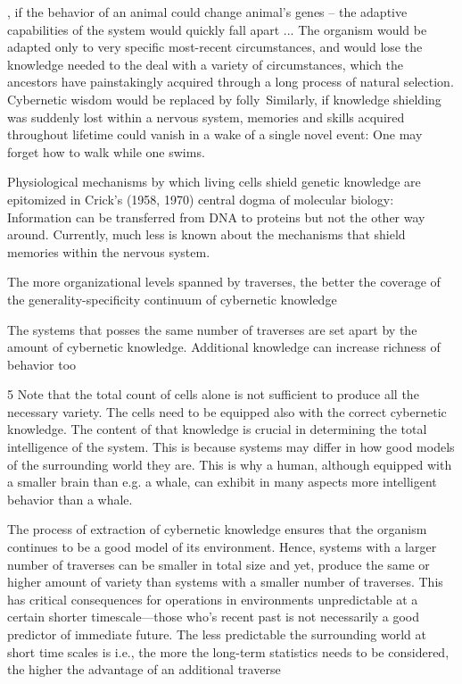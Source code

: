 \documentclass[10pt,a4paper]{article}
\begin{document}
, if the behavior of an
animal could change animal’s genes – the adaptive capabilities of the
system would quickly fall apart ... The organism would be adapted only to very specific
most-recent circumstances, and would lose the knowledge needed to
the deal with a variety of circumstances, which the ancestors have
painstakingly acquired through a long process of natural selection.
Cybernetic wisdom would be replaced by folly\
Similarly, if knowledge shielding was suddenly lost within a
nervous system, memories and skills acquired throughout lifetime
could vanish in a wake of a single novel event: One may forget
how to walk while one swims.

Physiological mechanisms by which living cells shield genetic
knowledge are epitomized in Crick’s (1958, 1970) central dogma of
molecular biology: Information can be transferred from DNA to proteins
but not the other way around. Currently, much less is known about the
mechanisms that shield memories within the nervous system.

The more organizational levels spanned by
traverses, the better the coverage of the generality-specificity continuum
of cybernetic knowledge

The systems that posses the
same number of traverses are set apart by the amount of
cybernetic knowledge. Additional knowledge can increase richness
of behavior too

5 Note that the total count of cells alone is not sufficient to produce all the
necessary variety. The cells need to be equipped also with the correct cybernetic
knowledge. The content of that knowledge is crucial in determining the total
intelligence of the system. This is because systems may differ in how good models
of the surrounding world they are. This is why a human, although equipped with a
smaller brain than e.g. a whale, can exhibit in many aspects more intelligent
behavior than a whale.

The process of extraction of cybernetic knowledge ensures that the
organism continues to be a good model of its environment. Hence,
systems with a larger number of traverses can be smaller in total size
and yet, produce the same or higher amount of variety than systems
with a smaller number of traverses. This has critical consequences for
operations in environments unpredictable at a certain shorter timescale—those
who’s recent past is not necessarily a good predictor of
immediate future. The less predictable the surrounding world at
short time scales is i.e., the more the long-term statistics needs to be
considered, the higher the advantage of an additional traverse
\end{document}
